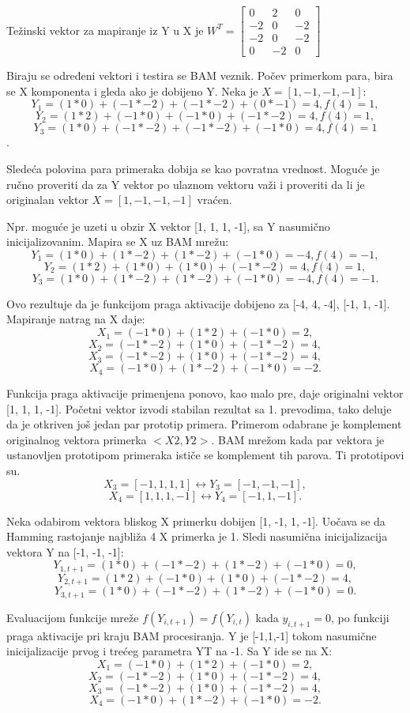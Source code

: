 \documentclass[fontsize=11bp, paper=a4]{scrarticle}
\begin{document}
Težinski vektor za mapiranje iz Y u X je $W^T = \begin{bmatrix}
    0&2&0\\
    -2 &0 &-2\\
    -2&0 &-2\\
    0 &-2 &0
\end{bmatrix}$

Biraju se određeni vektori i testira se BAM veznik. Počev primerkom para, bira se X komponenta i gleda ako je dobijeno Y. Neka je $X = [1, -1, -1, -1]$:
$$Y_1 = (1*0) + (-1*-2) + (-1*-2) + (0*-1) = 4, f(4) = 1,$$
$$Y_2 = (1*2) + (-1*0) + (-1*0) + (-1*-2) = 4, f(4) = 1,$$
$$Y_3 = (1*0) + (-1*-2) + (-1*-2) + (-1*0) = 4, f(4) = 1$$.

Sledeća polovina para primeraka dobija se kao povratna vrednost. Moguće je ručno proveriti da za Y vektor po ulaznom vektoru važi i proveriti da li je originalan vektor $X = [1, -1, -1, -1]$ vraćen.

Npr. moguće je uzeti u obzir X vektor [1, 1, 1, -1], sa Y nasumično inicijalizovanim.
Mapira se X uz BAM mrežu:
$$Y_1 = (1*0) + (1*-2) + (1*-2) + (-1*0) = -4, f(4) = -1,$$
$$Y_2 = (1*2) + (1*0) + (1*0) + (-1*-2) = 4, f(4) = 1,$$
$$Y_3 = (1*0) + (1*-2) + (1*-2) + (-1*0) = -4, f(4) = -1.$$

Ovo rezultuje da je funkcijom praga aktivacije dobijeno za [-4, 4, -4], [-1, 1, -1]. Mapiranje natrag na X daje:
$$X_1 = (-1*0) + (1*2) + (-1* 0) = 2,$$
$$X_2 = (-1*-2) + (1*0) + (-1*-2) = 4,$$
$$X_3 = (-1*-2) + (1*0) + (-1*-2) = 4,$$
$$X_4 = (-1*0) + (1*-2) + (-1*0) = -2.$$

Funkcija praga aktivacije primenjena ponovo, kao malo pre, daje originalni vektor [1, 1, 1, -1]. Početni vektor izvodi stabilan rezultat sa 1. prevodima, tako deluje da je otkriven još jedan par prototip primera. Primerom odabrane je komplement originalnog vektora primerka $<X2, Y2>$. BAM mrežom kada par vektora je ustanovljen prototipom primeraka ističe se komplement tih parova. Ti prototipovi su.
$$ X_3 = [-1, 1, 1, 1] \leftrightarrow Y_3 = [-1, -1, -1],$$
$$ X_4 = [1, 1, 1, -1] \leftrightarrow Y_4 = [-1, 1, -1].$$

Neka odabirom vektora bliskog X primerku dobijen [1, -1, 1, -1]. Uočava se da Hamming rastojanje najbliža 4 X primerka je 1. Sledi nasumična inicijalizacija vektora Y na [-1, -1, -1]:
$$Y_{1,t+1} = (1*0) + (-1*-2) + (1*-2) + (-1*0) = 0,$$
$$Y_{2,t+1} = (1*2) + (-1*0) + (1*0) + (-1*-2) = 4,$$
$$Y_{3,t+1} = (1*0) + (-1*-2) + (1*-2) + (-1*0) = 0.$$

Evaluacijom funkcije mreže $f(Y_{i,t+1}) = f(Y_{i,t})$ kada $y_{i,t+1} = 0$, po funkciji praga aktivacije pri kraju BAM procesiranja. Y je [-1,1,-1] tokom nasumične inicijalizacije prvog i trećeg parametra YT na -1. Sa Y ide se na X:
$$X_1 = (-1*0) + (1*2) + (-1* 0) = 2,$$
$$X_2 = (-1*-2) + (1*0) + (-1*-2) = 4,$$
$$X_3 = (-1*-2) + (1*0) + (-1*-2) = 4,$$
$$X_4 = (-1*0) + (1*-2) + (-1*0) = -2.$$
\end{document}
